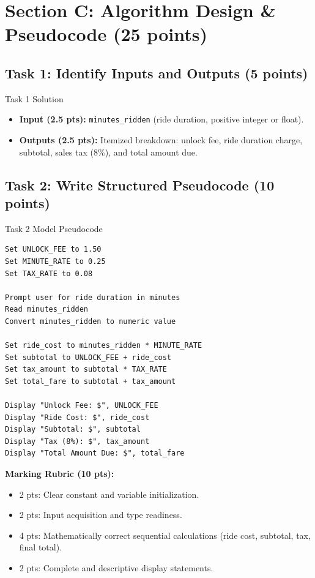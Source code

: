 \documentclass[11pt,a4paper]{article}
\begin{document}
\section*{Section C: Algorithm Design \& Pseudocode (25 points)}

\subsection*{Task 1: Identify Inputs and Outputs (5 points)}
\begin{solbox}{Task 1 Solution}
\begin{itemize}[noitemsep]
  \item \textbf{Input (2.5 pts):} \texttt{minutes\_ridden} (ride duration, positive integer or float).
  \item \textbf{Outputs (2.5 pts):} Itemized breakdown: unlock fee, ride duration charge, subtotal, sales tax ($8\%$), and total amount due.
\end{itemize}
\end{solbox}

\subsection*{Task 2: Write Structured Pseudocode (10 points)}
\begin{solbox}{Task 2 Model Pseudocode}
\begin{lstlisting}
Set UNLOCK_FEE to 1.50
Set MINUTE_RATE to 0.25
Set TAX_RATE to 0.08

Prompt user for ride duration in minutes
Read minutes_ridden
Convert minutes_ridden to numeric value

Set ride_cost to minutes_ridden * MINUTE_RATE
Set subtotal to UNLOCK_FEE + ride_cost
Set tax_amount to subtotal * TAX_RATE
Set total_fare to subtotal + tax_amount

Display "Unlock Fee: $", UNLOCK_FEE
Display "Ride Cost: $", ride_cost
Display "Subtotal: $", subtotal
Display "Tax (8%): $", tax_amount
Display "Total Amount Due: $", total_fare
\end{lstlisting}
\textbf{Marking Rubric (10 pts):}
\begin{itemize}[noitemsep]
  \item 2 pts: Clear constant and variable initialization.
  \item 2 pts: Input acquisition and type readiness.
  \item 4 pts: Mathematically correct sequential calculations (ride cost, subtotal, tax, final total).
  \item 2 pts: Complete and descriptive display statements.
\end{itemize}
\end{solbox}
\end{document}
